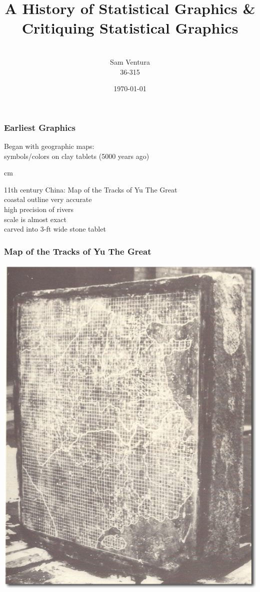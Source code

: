 \documentclass{beamer} %
\begin{document}
\title[dedup]{A History of Statistical Graphics \& \\ Critiquing Statistical Graphics}


\author[Samuel L. Ventura]{\\
  \large{Sam Ventura\\36-315}}
\date{\today}


\begin{frame}
	\maketitle
	
\end{frame}


\begin{frame}\frametitle{Earliest Graphics}
\centering
Began with geographic maps:  \\symbols/colors on clay tablets (5000 years ago)

 cm

11th century China:  Map of the Tracks of Yu The Great\\coastal outline very accurate\\high precision of rivers\\scale is almost exact\\carved into 3-ft wide stone tablet

\end{frame}



\begin{frame}\frametitle{Map of the Tracks of Yu The Great}
	\centering
	\includegraphics[width=0.6\linewidth]{yu2.png}
\end{frame}
\end{document}
